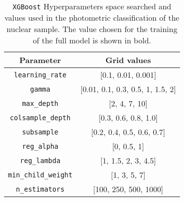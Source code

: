 \begin{table*}
    \centering
    \def\arraystretch{1.5}
    \begin{tabular}{c c}
        \textbf{Parameter}          & \textbf{Grid values}             \\
        \hline
        \texttt{learning\_rate}     & [0.1, 0.01, 0.001]               \\
        \texttt{gamma}              & [0.01, 0.1, 0.3, 0.5, 1, 1.5, 2] \\
        \texttt{max\_depth}         & [2, 4, 7, 10]                    \\
        \texttt{colsample\_depth}   & [0.3, 0.6, 0.8, 1.0]             \\
        \texttt{subsample}          & [0.2, 0.4, 0.5, 0.6, 0.7]        \\
        \texttt{reg\_alpha}         & [0, 0.5, 1]                      \\
        \texttt{reg\_lambda}        & [1, 1.5, 2, 3, 4.5]              \\
        \texttt{min\_child\_weight} & [1, 3, 5, 7]                     \\
        \texttt{n\_estimators}      & [100, 250, 500, 1000]            \\
    \end{tabular}
    \caption[\texttt{XGBoost} Hyperparameters]{\texttt{XGBoost} Hyperparameters space searched and values used in the photometric classification of the nuclear sample. The value chosen for the training of the full model is shown in bold.}
    \label{tab:xgboost_grid_search}
\end{table*}
